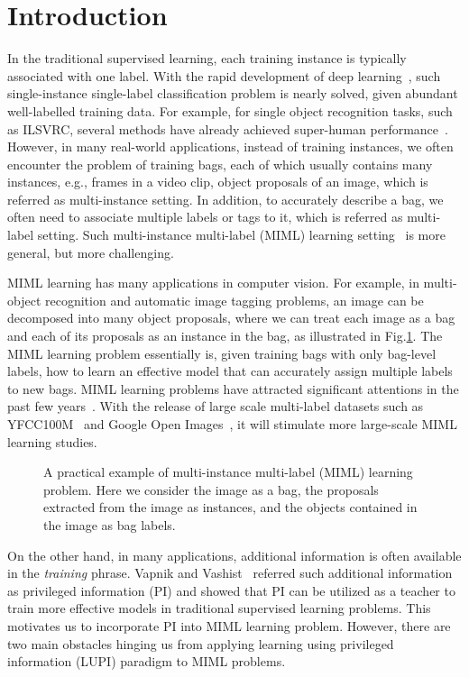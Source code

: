 \documentclass[10pt,twocolumn,letterpaper]{article}
\begin{document}
\section{Introduction}

In the traditional supervised learning, each training instance is
typically associated with one label. With the rapid development of
deep learning~\cite{Alex2012}, such single-instance single-label
classification problem is nearly solved, given abundant
well-labelled training data. For example, for single object
recognition tasks, such as ILSVRC, several methods have already
achieved super-human performance~\cite{He2015,He2016,Ioffe2015}.
However, in many real-world applications, instead of training
instances, we often encounter the problem of training bags, each
of which usually contains many instances, e.g., frames in a video
clip, object proposals of an image, which is referred as
multi-instance setting. In addition, to accurately describe a bag,
we often need to associate multiple labels or tags to it, which is
referred as multi-label setting. Such multi-instance multi-label
(MIML) learning setting~\cite{Zhou2012} is more general, but more
challenging.

MIML learning has many applications in computer vision. For
example, in multi-object recognition and automatic image tagging
problems, an image can be decomposed into many object proposals,
where we can treat each image as a bag and each of its proposals
as an instance in the bag, as illustrated in
Fig.\ref{example-miml}. The MIML learning problem essentially is,
given training bags with only bag-level labels, how to learn an
effective model that can accurately assign multiple labels to new
bags. MIML learning problems have attracted significant attentions
in the past few
years~\cite{Simonyan2014,Yang2016a,Oquab2014,Bilen2016}. With the
release of large scale multi-label datasets such as
YFCC100M~\cite{YFCC100M} and Google Open Images~\cite{openimages},
it will stimulate more large-scale MIML learning studies.

\begin{figure}
	\caption{A practical example of multi-instance multi-label (MIML) learning problem. Here we consider the image as a bag, the proposals extracted from the image as instances, and the objects contained in the image as bag labels.}
	\label{example-miml}
\end{figure}

On the other hand, in many applications, additional information is
often available in the \emph{training} phrase. Vapnik and
Vashist~\cite{Vapnik2009} referred such additional information as
privileged information (PI) and showed that PI can be utilized as
a teacher to train more effective models in traditional supervised
learning problems. This motivates us to incorporate PI into MIML
learning problem. However, there are two main obstacles hinging us
from applying learning using privileged information (LUPI)
paradigm to MIML problems.
\end{document}
